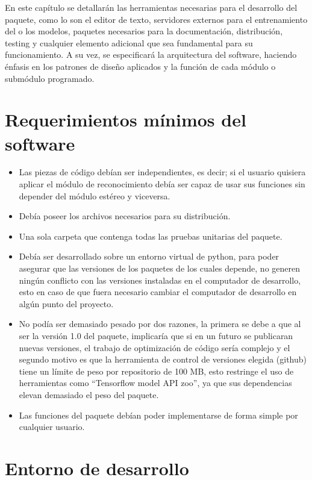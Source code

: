 En este capítulo se detallarán las herramientas necesarias para el desarrollo del paquete, como lo son el editor de texto, servidores externos para el entrenamiento del o los modelos, paquetes necesarios para la documentación, distribución, testing y cualquier elemento adicional que sea fundamental para su funcionamiento. A su vez, se especificará la arquitectura del software, haciendo énfasis en los patrones de diseño aplicados y la función de cada módulo o submódulo programado.
\section{Requerimientos mínimos del software}
\begin{itemize}
    \item Las piezas de código debían ser independientes, es decir; si el usuario quisiera aplicar el módulo de reconocimiento debía ser capaz de usar sus funciones sin depender del módulo estéreo y viceversa.
    \item Debía poseer los archivos necesarios para su distribución.
    \item Una sola carpeta que contenga todas las pruebas unitarias del paquete.
    \item Debía ser desarrollado sobre un entorno virtual de python, para poder asegurar que las versiones de los paquetes de los cuales depende, no generen ningún conflicto con las versiones instaladas en el computador de desarrollo, esto en caso de que fuera necesario cambiar el computador de desarrollo en algún punto del proyecto.
    \item No podía ser demasiado pesado por dos razones, la primera se debe a que al ser la versión 1.0 del paquete, implicaría que si en un futuro se publicaran nuevas versiones, el trabajo de optimización de código sería complejo y el segundo motivo es que la herramienta de control de versiones elegida (github) tiene un límite de peso por repositorio de 100 MB, esto restringe el uso de herramientas como ``Tensorflow model API zoo'', ya que sus dependencias elevan demasiado el peso del paquete.
    \item Las funciones del paquete debían poder implementarse de forma simple por cualquier usuario.
\end{itemize}
\section{Entorno de desarrollo}
